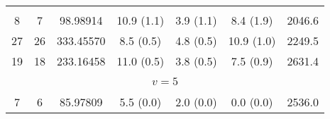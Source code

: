 \begin{table*}[htp]
\begin{tabular}{ccccccc}
\vspace{-0.75em}\\
 8 & 7 & 98.98914 & 10.9 (1.1) & 3.9 (1.1) & 8.4 (1.9) & 2046.6 \\
 27 & 26 & 333.45570 & 8.5 (0.5) & 4.8 (0.5) & 10.9 (1.0) & 2249.5 \\
 19 & 18 & 233.16458 & 11.0 (0.5) & 3.8 (0.5) & 7.5 (0.9) & 2631.4 \\
\hline
&\vspace{-0.75em}\\
\multicolumn{7}{c}{$v = 5$} \\
\vspace{-0.75em}\\
 7 & 6 & 85.97809 & 5.5 (0.0) & 2.0 (0.0) & 0.0 (0.0) & 2536.0 \\
\end{tabular}

\par 
\end{table*}
